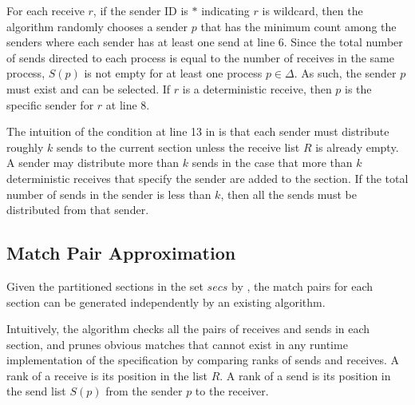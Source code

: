 
For each receive $r$, if the sender ID is $\ast$ indicating $r$ is wildcard, then the algorithm randomly chooses a sender $p$ that has the minimum count among the senders where each sender has at least one send at line 6. Since the total number of sends directed to each process is equal to the number of receives in the same process, $S(p)$ is not empty for at least one process $p \in \Delta$. As such, the sender $p$ must exist and can be selected. 
If $r$ is a deterministic receive, then $p$ is the specific sender for $r$ at line 8. 

The intuition of the condition at line 13 in  is that each sender must distribute roughly $k$ sends to the current section unless the receive list $R$ is already empty. A sender may distribute more than $k$ sends in the case that more than $k$ deterministic receives that specify the sender are added to the section. If the total number of sends in the sender is less than $k$, then all the sends must be distributed from that sender.  



 
 \subsection{Match Pair Approximation}

Given the partitioned sections in the set $\mathit{secs}$ by , the match pairs for each section can be generated independently by an existing algorithm.

Intuitively, the algorithm checks all the pairs of receives and sends in each section, and prunes obvious matches that cannot exist in any runtime implementation of the specification by comparing ranks of sends and receives. 
A rank of a receive is its position in the list $R$. 
A rank of a send is its position in the send list $S(p)$ from the sender $p$ to the receiver.    

